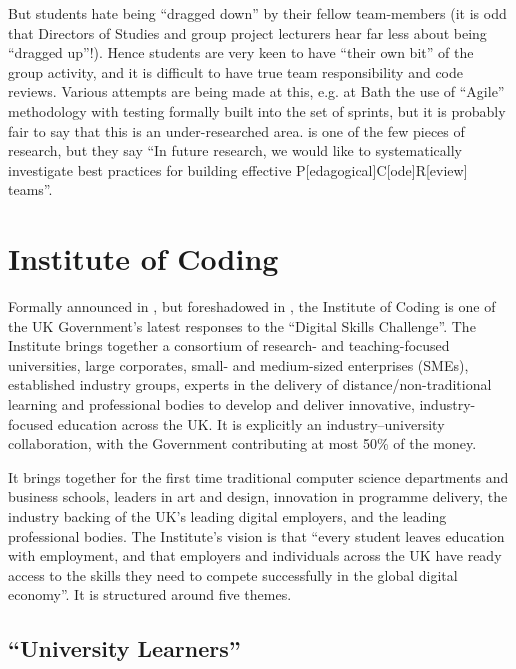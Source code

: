 \documentclass[sigconf,anonymous]{acmart}
\begin{document}
But students hate being ``dragged down'' by their fellow team-members (it is odd that Directors of Studies and group project lecturers hear far less about being ``dragged up''!).  Hence students are very keen to have ``their own bit'' of the group activity, and it is difficult to have true team responsibility and code reviews.  Various attempts are being made at this, e.g. at Bath the use of ``Agile'' methodology with testing formally built into the  set of sprints, but it is probably fair to say that this is an under-researched area.  \cite{Hundhausenetal2013a} is one of the few pieces of research, but they say ``In future research, we would like to systematically investigate best practices for building effective P[edagogical]C[ode]R[eview] teams''. 

\section{Institute of Coding}\label{ioc}

Formally announced in \cite{DfE2018a}, but foreshadowed in
\cite{HMG2015a}, the Institute of Coding is one of the UK Government's
latest responses to the ``Digital Skills Challenge''. The Institute
brings together a consortium of research- and teaching-focused
universities, large corporates, small- and medium-sized enterprises
(SMEs), established industry groups, experts in the delivery of
distance/non-traditional learning and professional bodies to develop
and deliver innovative, industry-focused education across the UK. It
is explicitly an industry--university collaboration, with the
Government contributing at most 50\% of the money.

It brings together for the first time traditional computer science
departments and business schools, leaders in art and design,
innovation in programme delivery, the industry backing of the UK's
leading digital employers, and the leading professional bodies.  The
Institute's vision is that ``every student leaves education with
employment, and that employers and individuals across the UK have
ready access to the skills they need to compete successfully in the
global digital economy''. It is structured around five themes.

\subsection{``University Learners''}
\end{document}
